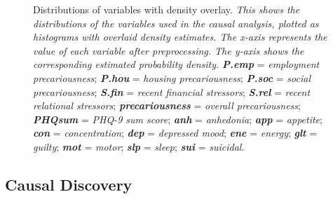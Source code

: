 \documentclass[
]{article}
\begin{document}
\begin{figure}


\caption{\label{fig-dist}Distributions of variables with density
overlay. \emph{This shows the distributions of the variables used in the
causal analysis, plotted as histograms with overlaid density estimates.
The x-axis represents the value of each variable after preprocessing.
The y-axis shows the corresponding estimated probability density.}
\textbf{\emph{P.emp}} = \emph{employment precariousness};
\textbf{\emph{P.hou}} = \emph{housing precariousness};
\textbf{\emph{P.soc}} = \emph{social precariousness};
\textbf{\emph{S.fin}} = \emph{recent financial stressors};
\textbf{\emph{S.rel}} = \emph{recent relational stressors};
\textbf{\emph{precariousness}} = \emph{overall precariousness};
\textbf{\emph{PHQsum}} = \emph{PHQ-9 sum score}; \textbf{\emph{anh}} =
\emph{anhedonia}; \textbf{\emph{app}} = \emph{appetite};
\textbf{\emph{con}} = \emph{concentration}; \textbf{\emph{dep}} =
\emph{depressed mood}; \textbf{\emph{ene}} = \emph{energy};
\textbf{\emph{glt}} = \emph{guilty}; \textbf{\emph{mot}} = \emph{motor};
\textbf{\emph{slp}} = \emph{sleep}; \textbf{\emph{sui}} =
\emph{suicidal}.}

\end{figure}%

\subsection{Causal Discovery}\label{sec-analysis}
\end{document}
